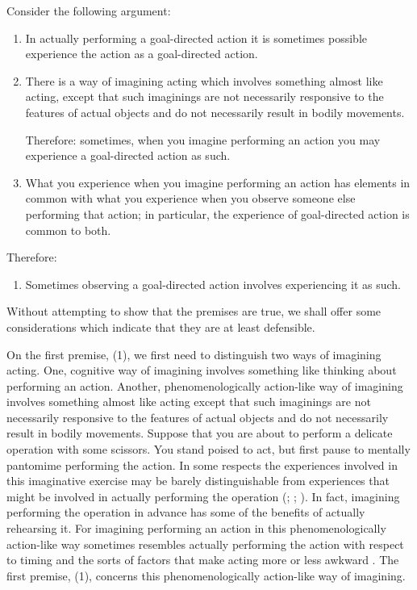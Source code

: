 \documentclass[12pt,\papersize]{extarticle}
\begin{document}
Consider the following argument:
%
\begin{enumerate}
\item
In actually performing a goal-directed action it is sometimes possible experience the action as a goal-directed action.

\item
There is a way of imagining acting which involves something almost like acting, except that such imaginings are not necessarily responsive to the features of actual objects and do not necessarily result in bodily movements.

Therefore: sometimes, when you imagine performing an action you may experience a goal-directed action as such.

\item
What you experience when you imagine performing an action has elements in common with what you experience when you observe someone else performing that action; in particular, the experience of goal-directed action is common to both.
\end{enumerate}
Therefore:
\begin{enumerate}[resume]
\item
Sometimes observing a goal-directed action involves experiencing it as such.
\end{enumerate}
%
Without attempting to show that the premises are true, we shall offer some considerations which indicate that they are at least defensible. 

On the first premise, (1), we first need to distinguish two ways of imagining acting.  One, cognitive way of imagining involves something like thinking about performing an action.  Another, phenomenologically action-like way of imagining involves something almost like acting except that such imaginings are not necessarily responsive to the features of actual objects and do not necessarily result in bodily movements.  Suppose that you are about to perform a delicate operation with some scissors. You stand poised to act, but first pause to mentally pantomime performing the action. In some respects the experiences involved in this imaginative exercise may be barely distinguishable from experiences that might be involved in actually performing the operation (\citealp[p.\ 161]{currie:1997_mental}; \citealp[p.\ 727]{jeannerod:1995_mental}; \citealp[p.\ 638-9]{kosslyn:2001_neural}).  In fact, imagining performing the operation in advance has some of the benefits of actually rehearsing it.  For imagining performing an action in this phenomenologically action-like way sometimes resembles actually performing the action with respect to timing \citep{decety:1989_timing, decety:1996_imagined, Jeannerod:1994oz} and the sorts of factors that make acting more or less awkward \citep{parsons:1994_temporal, frak:2001_orientation}.  The first premise, (1), concerns this phenomenologically action-like way of imagining.  
\end{document}
